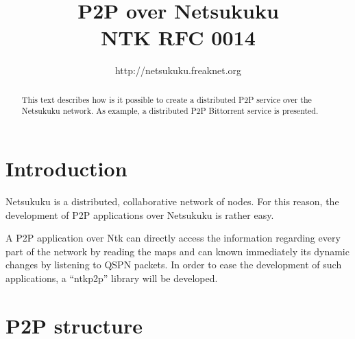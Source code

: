 \documentclass[a4paper]{article}
\title{P2P over Netsukuku\\\small{NTK RFC 0014}}
\author{http://netsukuku.freaknet.org}
\def\ove#1{{\overline{#1}}}
\theoremstyle{definition}
\begin{document}
\maketitle
\begin{abstract}
This text describes how is it possible to create a distributed P2P service
over the Netsukuku network. As example, a distributed P2P Bittorrent service
is presented.
\end{abstract}

\section{Introduction}
Netsukuku is a distributed, collaborative network of nodes. 
For this reason, the development of P2P applications over Netsukuku is
rather easy.

A P2P application over Ntk can directly access the information
regarding every part of the network by reading the maps and can known
immediately its dynamic changes by listening to QSPN packets.
In order to ease the development of such applications, a ``ntkp2p'' library will
be developed.

\section{P2P structure}
\def\key{\textbf{KEY}}
\def\ip{\textbf{IP}}
\def\ipe{\textbf{IP}^*}
\def\PID{\textbf{PID}}
\def\h{{\ove h}}
\end{document}
